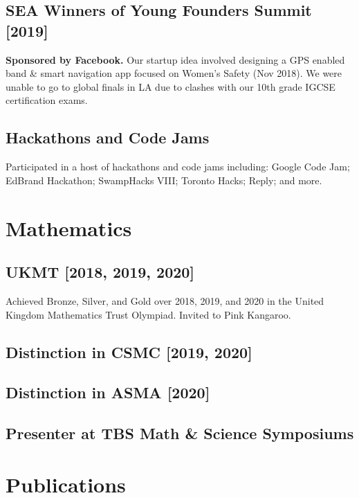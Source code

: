 \documentclass[%
               doublesided,
               paper=a4,
               fontsize=10pt
              ]{my-resume}
\begin{document}
{        \subsection{SEA Winners of Young Founders Summit [2019]}
            \textbf{Sponsored by Facebook.}  Our startup idea involved designing a GPS enabled band & smart navigation app focused on Women’s Safety (Nov 2018). We were unable to go to global finals in LA due to clashes with our 10th grade IGCSE certification exams.
            
        \subsection{Hackathons and Code Jams}
            Participated in a host of hackathons and code jams including: Google Code Jam; EdBrand Hackathon; SwampHacks VIII; Toronto Hacks; Reply; and more.
            
    \section{Mathematics}
        \subsection{UKMT [2018, 2019, 2020]}
            Achieved Bronze, Silver, and Gold over 2018, 2019, and 2020 in the United Kingdom Mathematics Trust Olympiad. Invited to Pink Kangaroo.
            
        \subsection{Distinction in CSMC [2019, 2020]}
        
        \subsection{Distinction in ASMA [2020]}
            
        \subsection{Presenter at TBS Math \& Science Symposiums}

}
\makebody


\clearpage
\pagestyle{empty}

\section{Publications}
\pubforcefullwidth
\end{document}

